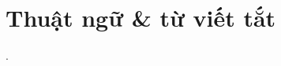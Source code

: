 \newcommand{\abbrlabel}[1]{\makebox[3cm][l]{\textbf{#1}\ \dotfill}}
\newenvironment{abbreviations}{\begin{list}{}{\renewcommand{\makelabel}{\abbrlabel}}}{\end{list}}

\chapter*{Thuật ngữ \& từ viết tắt}
\thispagestyle{empty}
\pagestyle{empty}
\vspace{1.0cm}
\begin{abbreviations}
	\item .
\end{abbreviations}